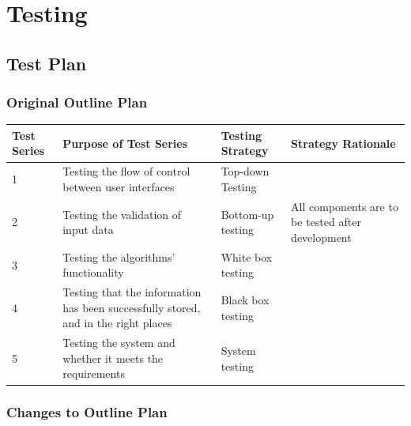 \chapter{Testing}

\section{Test Plan}

\begin{landscape}
\subsection{Original Outline Plan}

\begin{center}
    \begin{tabular}{|p{2cm}|p{5cm}|p{5cm}|p{4cm}|}
        \hline
        \textbf{Test Series} & \textbf{Purpose of Test Series} & \textbf{Testing Strategy} & \textbf{Strategy Rationale}\\ \hline
        1 & Testing the flow of control between user interfaces & Top-down Testing & \\ \hline
        2 & Testing the validation of input data & Bottom-up testing & All components are to be tested after development \\ \hline
        3 & Testing the algorithms' functionality & White box testing & \\ \hline
        4 & Testing that the information has been successfully stored, and in the right places & Black box testing & \\ \hline
        5 & Testing the system and whether it meets the requirements & System testing & \\ \hline
    \end{tabular}
\end{center}


\subsection{Changes to Outline Plan}


\end{landscape}
